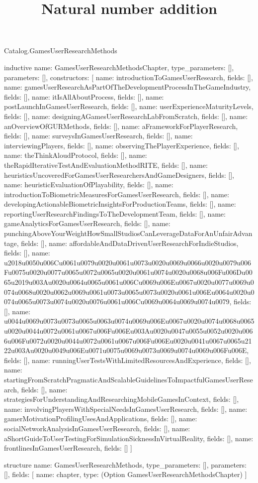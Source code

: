 \begin{lexlean}{Catalog.GamesUserResearchMethods}
\title{Natural number addition}
\begin{semanticmodule}
inductive{
  name: GamesUserResearchMethodsChapter,
  type_parameters: [],
  parameters: [],
  constructors: [
    {name: introductionToGamesUserResearch, fields: []},
    {name: gamesUserResearchAsPartOfTheDevelopmentProcessInTheGameIndustry, fields: []},
    {name: itIsAllAboutProcess, fields: []},
    {name: postLaunchInGamesUserResearch, fields: []},
    {name: userExperienceMaturityLevels, fields: []},
    {name: designingAGamesUserResearchLabFromScratch, fields: []},
    {name: anOverviewOfGURMethods, fields: []},
    {name: aFrameworkForPlayerResearch, fields: []},
    {name: surveysInGamesUserResearch, fields: []},
    {name: interviewingPlayers, fields: []},
    {name: observingThePlayerExperience, fields: []},
    {name: theThinkAloudProtocol, fields: []},
    {name: theRapidIterativeTestAndEvaluationMethodRITE, fields: []},
    {name: heuristicsUncoveredForGamesUserResearchersAndGameDesigners, fields: []},
    {name: heuristicEvaluationOfPlayability, fields: []},
    {name: introductionToBiometricMeasuresForGamesUserResearch, fields: []},
    {name: developingActionableBiometricInsightsForProductionTeams, fields: []},
    {name: reportingUserResearchFindingsToTheDevelopmentTeam, fields: []},
    {name: gameAnalyticsForGamesUserResearch, fields: []},
    {name: punchingAboveYourWeightHowSmallStudiosCanLeverageDataForAnUnfairAdvantage, fields: []},
    {name: affordableAndDataDrivenUserResearchForIndieStudios, fields: []},
    {name: u2018u0050u006Cu0061u0079u0020u0061u0073u0020u0069u0066u0020u0079u006Fu0075u0020u0077u0065u0072u0065u0020u0061u0074u0020u0068u006Fu006Du0065u2019u003Au0020u0064u0065u0061u006Cu0069u006Eu0067u0020u0077u0069u0074u0068u0020u0062u0069u0061u0073u0065u0073u0020u0061u006Eu0064u0020u0074u0065u0073u0074u0020u0076u0061u006Cu0069u0064u0069u0074u0079, fields: []},
    {name: u0044u0069u0073u0073u0065u0063u0074u0069u006Eu0067u0020u0074u0068u0065u0020u0044u0072u0061u0067u006Fu006Eu003Au0020u0047u0055u0052u0020u0066u006Fu0072u0020u0044u0072u0061u0067u006Fu006Eu0020u0041u0067u0065u2122u003Au0020u0049u006Eu0071u0075u0069u0073u0069u0074u0069u006Fu006E, fields: []},
    {name: runningUserTestsWithLimitedResourcesAndExperience, fields: []},
    {name: startingFromScratchPragmaticAndScalableGuidelinesToImpactfulGamesUserResearch, fields: []},
    {name: strategiesForUnderstandingAndResearchingMobileGamesInContext, fields: []},
    {name: involvingPlayersWithSpecialNeedsInGamesUserResearch, fields: []},
    {name: gamerMotivationProfilingUsesAndApplications, fields: []},
    {name: socialNetworkAnalysisInGamesUserResearch, fields: []},
    {name: aShortGuideToUserTestingForSimulationSicknessInVirtualReality, fields: []},
    {name: frontlinesInGamesUserResearch, fields: []}
  ]
}

structure{
  name: GamesUserResearchMethods,
  type_parameters: [],
  parameters: [],
  fields: [
    {name: chapter, type: (Option GamesUserResearchMethodsChapter)}
  ]
}
\end{semanticmodule}
\end{lexlean}
